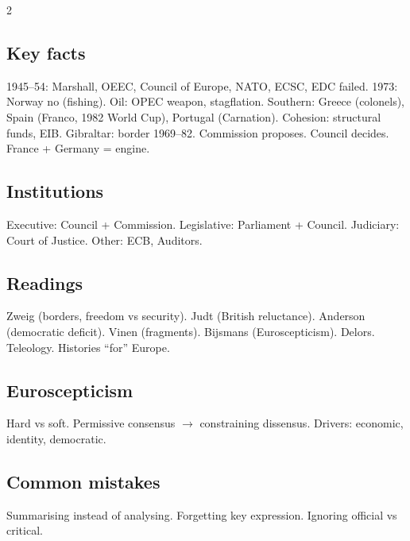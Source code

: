 \documentclass[10pt,landscape,a4paper]{article}
\begin{document}
\begin{multicols}{2}
\subsection*{\color{accent} Key facts}
1945--54: Marshall, OEEC, Council of Europe, NATO, ECSC, EDC failed. 1973: Norway no (fishing). Oil: OPEC weapon, stagflation. Southern: Greece (colonels), Spain (Franco, 1982 World Cup), Portugal (Carnation). Cohesion: structural funds, EIB. Gibraltar: border 1969--82. Commission proposes. Council decides. France + Germany = engine.

\subsection*{\color{accent} Institutions}
Executive: Council + Commission. Legislative: Parliament + Council. Judiciary: Court of Justice. Other: ECB, Auditors.

\subsection*{\color{accent} Readings}
Zweig (borders, freedom vs security). Judt (British reluctance). Anderson (democratic deficit). Vinen (fragments). Bijsmans (Euroscepticism). Delors. Teleology. Histories ``for'' Europe.

\subsection*{\color{accent} Euroscepticism}
Hard vs soft. Permissive consensus $\to$ constraining dissensus. Drivers: economic, identity, democratic.

\subsection*{\color{accent} Common mistakes}
Summarising instead of analysing. Forgetting key expression. Ignoring official vs critical.
\end{multicols}
\end{document}
